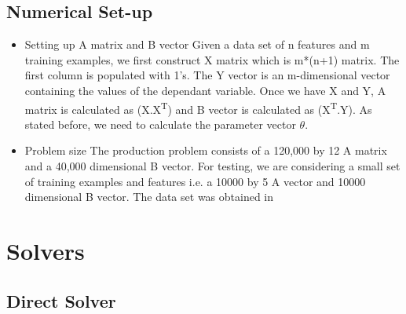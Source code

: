 \documentclass{article}
\begin{document}
\begin{spacing}{1.1}
\subsection{Numerical Set-up}

\begin{itemize}
    \item Setting up A matrix and B vector \newline
    Given a data set of n features and m training examples, we first construct X matrix which is m*(n+1) matrix. The first column is populated with 1's. The Y vector is an m-dimensional vector containing the values of the dependant variable. Once we have X and Y, A matrix is calculated as (X.X\textsuperscript{T}) and B vector is calculated as (X\textsuperscript{T}.Y). As stated before, we need to calculate the parameter vector $\theta$.
    \item Problem size \newline
    The production problem consists of a 120,000 by 12 A matrix and a 40,000 dimensional B vector. For testing, we are considering a small set of training examples and features i.e. a 10000 by 5 A vector and 10000 dimensional B vector. The data set was obtained in \cite{UCIDataset}
    
\end{itemize}

\section{Solvers}

\subsection{Direct Solver}


\end{spacing}
\end{document}
